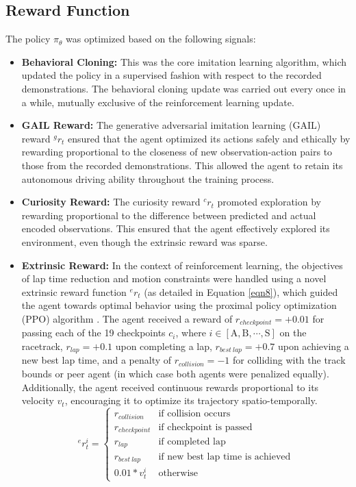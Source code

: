 \documentclass[letterpaper, 10 pt, conference]{ieeeconf}  %
\begin{document}
\subsection{Reward Function}
\label{Sub-Section: Reward Function II}

The policy $\pi_{\theta}$ was optimized based on the following signals:

\begin{itemize}
	\item \textbf{Behavioral Cloning:} This was the core imitation learning algorithm, which updated the policy in a supervised fashion with respect to the recorded demonstrations. The behavioral cloning \cite{bain1995} update was carried out every once in a while, mutually exclusive of the reinforcement learning update.
	\item \textbf{GAIL Reward:} The generative adversarial imitation learning (GAIL) reward \cite{ho2016} $^{g}r_t$ ensured that the agent optimized its actions safely and ethically by rewarding proportional to the closeness of new observation-action pairs to those from the recorded demonstrations. This allowed the agent to retain its autonomous driving ability throughout the training process.
	\item \textbf{Curiosity Reward:} The curiosity reward \cite{pathak2017} $^{c}r_t$ promoted exploration by rewarding proportional to the difference between predicted and actual encoded observations. This ensured that the agent effectively explored its environment, even though the extrinsic reward was sparse.
	\item \textbf{Extrinsic Reward:} In the context of reinforcement learning, the objectives of lap time reduction and motion constraints were handled using a novel extrinsic reward function $^{e}r_t$ (as detailed in Equation \ref{eqn8}), which guided the agent towards optimal behavior using the proximal policy optimization (PPO) algorithm \cite{PPO2017}. The agent received a reward of $r_{checkpoint}=+0.01$ for passing each of the 19 checkpoints $c_i$, where $i \in \left [ \text{A}, \text{B}, \cdots, \text{S} \right ]$ on the racetrack, $r_{lap}=+0.1$ upon completing a lap, $r_{best\:lap}=+0.7$ upon achieving a new best lap time, and a penalty of $r_{collision}=-1$ for colliding with the track bounds or peer agent (in which case both agents were penalized equally). Additionally, the agent received continuous rewards proportional to its velocity $v_t$, encouraging it to optimize its trajectory spatio-temporally.
    \begin{equation}
    ^{e}r_t^i  =  
    \begin{cases}
    r_{collision} & \text{if collision occurs} \\
    r_{checkpoint} & \text{if checkpoint is passed} \\
    r_{lap} & \text{if completed lap} \\
    r_{best\:lap} & \text{if new best lap time is achieved} \\
    0.01*v_t^i & \text{otherwise}
    \end{cases}
    \label{eqn8}
    \end{equation}
\end{itemize}
\end{document}
